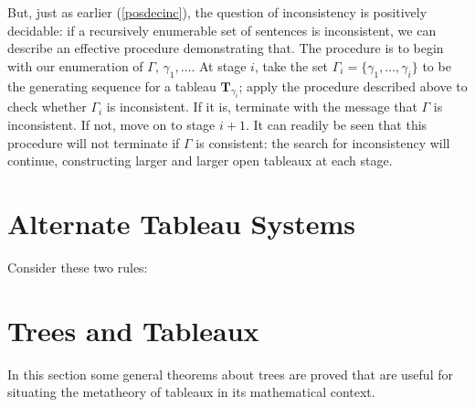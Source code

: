 But, just as earlier (\autoref{posdecinc}), the question of inconsistency is positively decidable: if a recursively enumerable set of sentences is inconsistent, we can describe an effective procedure demonstrating that. The procedure is to begin with our enumeration of $\Gamma$, $\gamma_{1},…$. At stage $i$, take the set $\Gamma_{i} = \{ \gamma_{1},…,\gamma_{i}\}$ to be the generating sequence for a tableau $\mathbf{T}_{\gamma_{i}}$; apply the procedure described above to check whether $\Gamma_{i}$ is inconsistent. If it is, terminate with the message that $\Gamma$ is inconsistent. If not, move on to stage $i+1$. It can readily be seen that this procedure will not terminate if $\Gamma$ is consistent: the search for inconsistency will continue, constructing larger and larger open tableaux at each stage.


\section{Alternate Tableau Systems}


Consider these two rules: \begin{center}
	{\leaf{$\neg\phi\vee\neg\psi$}\qobitree} 
\end{center}




\section{Trees and Tableaux}

In this section some general theorems about trees are proved that are useful for situating the metatheory of tableaux in its mathematical context.

